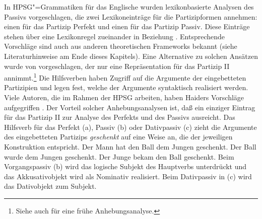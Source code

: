 In HPSG"=Grammatiken für das Englische wurden lexikonbasierte Analysen des Passivs vorgeschlagen,
die zwei Lexikoneinträge für die Partizipformen annehmen: einen für das Partizip Perfekt und einen
für das Partizip Passiv. Diese Einträge stehen über eine Lexikonregel zueinander in Beziehung
\citep[--218]{ps}. Entsprechende Vorschläge sind auch aus anderen theoretischen Frameworks
bekannt (siehe Literaturhinweise am Ende dieses Kapitels). Eine Alternative zu solchen Ansätzen
wurde von \citet{Haider86} vorgeschlagen, der nur eine Repräsentation für das Partizip II annimmt.\footnote{
        Siehe auch  für eine frühe Anhebungsanalyse.%
}
Die Hilfsverben haben Zugriff auf die Argumente der eingebetteten Partizipien und legen fest,
welche der Argumente syntaktisch realisiert werden. Viele Autoren, die im Rahmen der HPSG arbeiten,
haben Haiders Vorschläge aufgegriffen \citep{Kathol91a,Kathol94a,HM94a,Lebeth94,Pollard94a,Ryu97a,Mueller99a,Mueller2002g,Gunkel2003b}.
Der Vorteil solcher Anhebungsanalysen ist, daß ein einziger Eintrag für das Partizip II zur Analyse
des Perfekts und des Passivs ausreicht. Das Hilfsverb für das Perfekt (a), 
Passiv (b) oder Dativpassiv (c) zieht die Argumente
des eingebetteten Partizips \emph{geschenkt} auf eine Weise an, die der jeweiligen Konstruktion
entspricht.
\eal
\label{bsp-kasus-geschenkt}
\ex Der Mann  hat   den Ball   dem Jungen geschenkt.
\ex Der Ball  wurde dem Jungen            geschenkt.
\ex Der Junge bekam den Ball geschenkt.
\zl
Beim Vorgangspassiv (b) wird das logische Subjekt des Hauptverbs unterdrückt und das
Akkusativobjekt wird als Nominativ realisiert. Beim Dativpassiv in (c) wird das Dativobjekt
zum Subjekt.

